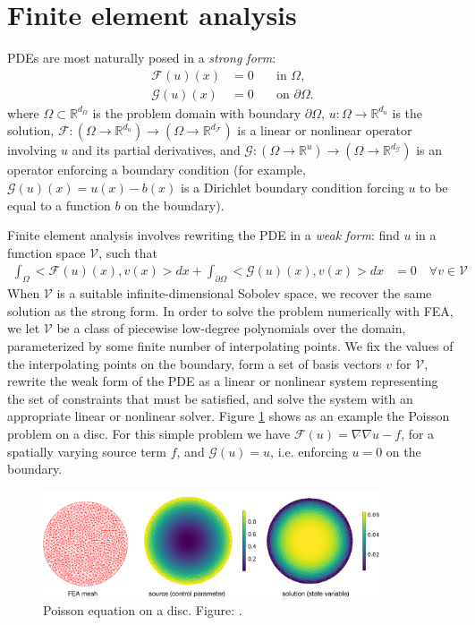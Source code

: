 \section{Finite element analysis}
\label{sec:metapde-fea}
PDEs are most naturally posed in a \emph{strong form}:
\begin{align}
\mathcal{F}(u)(x) &= 0 \quad &\text{in } \Omega, \label{eq:metapde-strongform} \\
\mathcal{G}(u)(x) &= 0 \quad &\text{on } \partial \Omega. \label{eq:metapde-bc}
\end{align}
where $\Omega \subset \mathbb{R}^{d_\Omega}$ is the problem domain with boundary $\partial \Omega$, $u: \Omega \to \mathbb{R}^{d_u}$
is the solution,
$\mathcal{F}: (\Omega \to \mathbb{R}^{d_u}) \to (\Omega \to \mathbb{R}^{d_\mathcal{F}})$
is a linear or nonlinear operator involving $u$ and its
partial derivatives, and
$\mathcal{G}: (\Omega \to \mathbb{R}^{u}) \to (\Omega \to \mathbb{R}^{d_\mathcal{G}})$
is an operator enforcing a boundary condition
(for example, $\mathcal{G}(u)(x) = u(x) - b(x)$ is a Dirichlet boundary condition
forcing $u$ to be equal to a function $b$ on the boundary).

Finite element analysis involves rewriting the PDE in a \emph{weak form}:
find $u$ in a function space $\mathcal{V}$, such that
\begin{align}
\int_{\Omega} <\mathcal{F}(u)(x), v(x)> dx + \int_{\partial \Omega} <\mathcal{G}(u)(x), v(x)> dx &= 0 \quad \forall v \in \mathcal{V} \label{eq:metapde-eakform}
\end{align}
When $\mathcal{V}$ is a suitable infinite-dimensional Sobolev space,
we recover the same solution as the strong form.
In order to solve the problem numerically with FEA,
we let $\mathcal{V}$ be a class of piecewise low-degree polynomials over the domain,
parameterized by some finite number of interpolating points.
We fix the values of the interpolating points on the boundary, form a set of basis
vectors $v$ for $\mathcal{V}$, rewrite the weak form of the PDE as a linear or
nonlinear system representing the set of constraints that must be satisfied,
and solve the system with an appropriate linear or nonlinear solver.
Figure \ref{fig:metapde-poisson} shows as an example the Poisson problem on a disc.
For this simple problem we have $\mathcal{F}(u) = \nabla \dot{} \nabla u - f$, for
a spatially varying source term $f$, and $\mathcal{G}(u) = u$, i.e. enforcing $u=0$
on the boundary.

\begin{figure}[t]
  \centering
\includegraphics[width=10cm]{figures/poisson_equation.pdf}
\caption{\small Poisson equation on a disc.
Figure: \citet{xue2020amortized}.}%
\label{fig:metapde-poisson}%
\end{figure}


